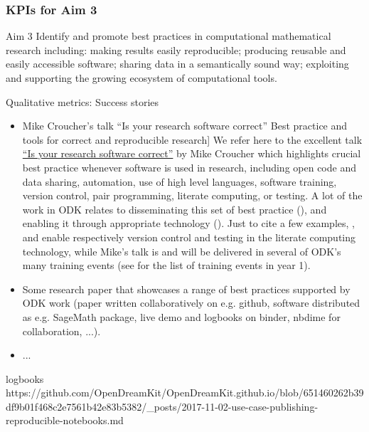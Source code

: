 \begin{Aim 1}
\begin{Aim 2}
\subsubsection{KPIs for Aim 3}

\begin{recommendation}{Aim 3}
  Identify and promote best practices in computational mathematical
  research including: making results easily reproducible; producing
  reusable and easily accessible software; sharing data in a
  semantically sound way; exploiting and supporting the growing
  ecosystem of computational tools.
\end{recommendation}

Qualitative metrics: Success stories
\begin{itemize}
\item Mike Croucher's talk ``Is your research software correct''
Best practice and tools for correct and reproducible research]
  We refer here to the excellent talk
  \href{https://mikecroucher.github.io/MLPM_talk/}{``Is your research
    software correct''} by Mike Croucher which highlights crucial best
  practice whenever software is used in research, including open code
  and data sharing, automation, use of high level languages, software
  training, version control, pair programming, literate computing, or
  testing. A lot of the work in ODK relates to disseminating this set of
  best practice (), and enabling it through
  appropriate technology ().  Just to cite a few
  examples, , and
   enable respectively version control
  and testing in the \Jupyter literate computing technology, while
  Mike's talk is and will be delivered in several of ODK's many
  training events (see  for the list
of training events in year 1).

\item Some research paper that showcases a range of best practices
  supported by ODK work (paper written collaboratively on e.g. github,
  software distributed as e.g. SageMath package, live demo and
  logbooks on binder, nbdime for collaboration, ...).
\item ...
\end{itemize}

logbooks 
https://github.com/OpenDreamKit/OpenDreamKit.github.io/blob/651460262b39df9b01f468c2e7561b42e83b5382/_posts/2017-11-02-use-case-publishing-reproducible-notebooks.md




\end{Aim 2}
\end{Aim 1}
